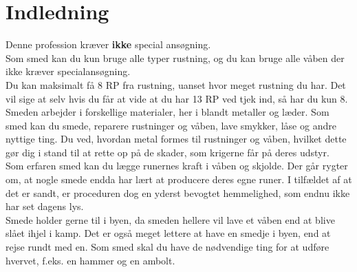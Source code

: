 \chapter{Indledning}

Denne profession kræver \textbf{ikke} special ansøgning.\\
Som smed kan du kun bruge alle typer rustning, og du kan bruge alle våben der ikke kræver specialansøgning.\\
Du kan maksimalt få 8 RP fra rustning, uanset hvor meget rustning du har. Det vil sige at selv hvis du får at vide at du har 13 RP ved tjek ind, så har du kun 8.\\

Smeden arbejder i forskellige materialer, her i blandt metaller og læder. Som smed kan du smede, reparere rustninger og våben, lave smykker, låse og andre nyttige ting. Du ved, hvordan metal formes til rustninger og våben, hvilket dette gør dig i stand til at rette op på de skader, som krigerne får på deres udstyr.\\
Som erfaren smed kan du lægge runernes kraft i våben og skjolde. Der går rygter om, at nogle smede endda har lært at producere deres egne runer. I tilfældet af at det er sandt, er proceduren dog en yderst bevogtet hemmelighed, som endnu ikke har set dagens lys.\\
Smede holder gerne til i byen, da smeden hellere vil lave et våben end at blive slået ihjel i kamp. Det er også meget lettere at have en smedje i byen, end at rejse rundt med en. Som smed skal du have de nødvendige ting for at udføre hvervet, f.eks. en hammer og en ambolt.